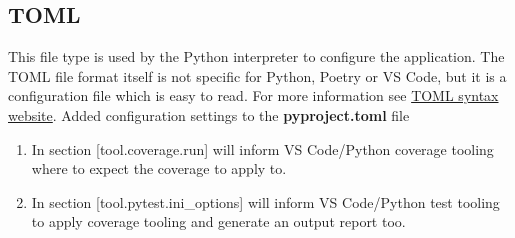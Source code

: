 \subsection{TOML}
This file type is used by the Python interpreter to configure the application.
The TOML file format itself is not specific for Python, Poetry or VS Code, but it is a configuration file which is easy to read.
For more information see \href{https://coverage.readthedocs.io/en/latest/config.html#toml-syntax}{TOML syntax website}.
Added configuration settings to the \textbf{pyproject.toml} file

\begin{enumerate}
	\item In section [tool.coverage.run]  will inform VS Code/Python coverage tooling where to expect the coverage to apply to.
	\item In section [tool.pytest.ini\_options]  will inform VS Code/Python test tooling to apply coverage tooling and generate an output report too.
\end{enumerate}

